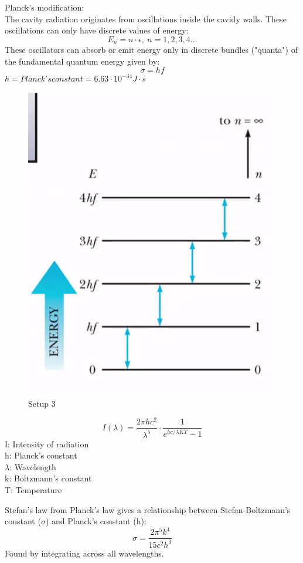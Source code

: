 \documentclass[class=article,crop=false]{standalone}
\begin{document}
Planck's modification:\\
The cavity radiation originates from oscillations inside the cavidy walls. These oscillations can only have discrete values of energy:
$$ E_n = n \cdot \epsilon,\ n = 1,2,3,4...$$
These oscillators can absorb or emit energy only in discrete bundles ("quanta") of the fundamental quantum energy given by:\\
$$ \sigma = hf $$
$ h = Planck's constant = 6.63 \cdot 10^{-34} J\cdot s $
\begin{figure}[h!]
	\centering
	\includegraphics[width=.7\linewidth]{./Images/oscillators.png}
	\caption{Setup 3}
\end{figure}

\newpage
\begin{result}
	$$ I(\lambda) = \frac{2\pi hc^2}{\lambda^5} \cdot \frac{1}{e^{hc/\lambda KT} - 1} $$
	I: Intensity of radiation \\
	h: Planck's constant\\
	$\lambda$: Wavelength\\
	k: Boltzmann's constant\\
	T: Temperature
\end{result}

Stefan's law from Planck's law gives a relationship between Stefan-Boltzmann's constant ($\sigma$) and Planck's constant (h): \\
$$ \sigma = \frac{2\pi^5k^4}{15c^2h^3} $$
Found by integrating across all wavelengths. \\\\
\end{document}

